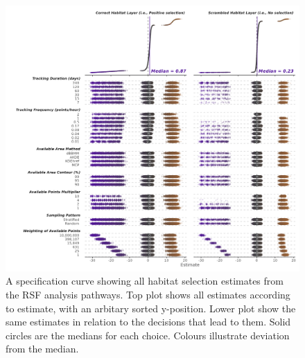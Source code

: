 \documentclass[10pt,a4paper]{article}
\begin{document}
\begin{figure}
\includegraphics[width=1\linewidth]{../figures/rsfSpecCurve} \caption{A specification curve showing all habitat selection estimates from the RSF analysis pathways. Top plot shows all estimates according to estimate, with an arbitary sorted y-position. Lower plot show the same estimates in relation to the decisions that lead to them. Solid circles are the medians for each choice. Colours illustrate deviation from the median.}\label{fig:specCurveRSF}
\end{figure}
\end{document}
